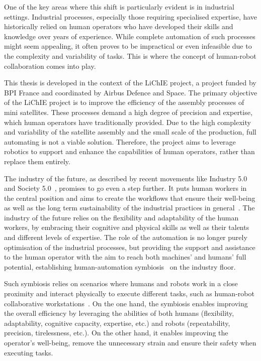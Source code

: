 One of the key areas where this shift is particularly evident is in industrial settings. Industrial processes, especially those requiring specialised expertise, have historically relied on human operators who have developed their skills and knowledge over years of experience. While complete automation of such processes might seem appealing, it often proves to be impractical or even infeasible due to the complexity and variability of tasks. This is where the concept of human-robot collaboration comes into play.

This thesis is developed in the context of the LiChIE project, a project funded by BPI France and coordinated by Airbus Defence and Space. The primary objective of the LiChIE project is to improve the efficiency of the assembly processes of mini satellites. These processes demand a high degree of precision and expertise, which human operators have traditionally provided. Due to the high complexity and variability of the satellite assembly and the small scale of the production, full automating is not a viable solution. Therefore, the project aims to leverage robotics to support and enhance the capabilities of human operators, rather than replace them entirely.

The industry of the future, as described by recent movements like Industry 5.0~\cite{MADDIKUNTA2022ind50} and Society 5.0~\cite{Huang2022society}, promises to go even a step further. 
It puts human workers in the central position and aims to create the workflows that ensure their well-being as well as the long term sustainability of the industrial practices in general~\cite{XU2021ind50}. The industry of the future relies on the flexibility and adaptability of the human workers, by embracing their cognitive and physical skills as well as their talents and different levels of expertise. The role of the automation is no longer purely optimisation of the industrial processes, but providing the support and assistance to the human operator with the aim to reach both machines' and humans' full potential, establishing human-automation symbiosis~\cite{LENG2022ind50} on the industry floor.

Such symbiosis relies on scenarios where humans and robots work in a close proximity and interact physically to execute different tasks, such as human-robot collaborative workstations~\cite{SIMOES2022workplace}. On the one hand, the symbiosis enables improving the overall efficiency by leveraging the abilities of both humans (flexibility, adaptability, cognitive capacity, expertise, etc.) and robots (repeatability, precision, tirelessness, etc.). On the other hand, it enables improving the operator's well-being, remove the unnecessary strain and ensure their safety when executing tasks. 

